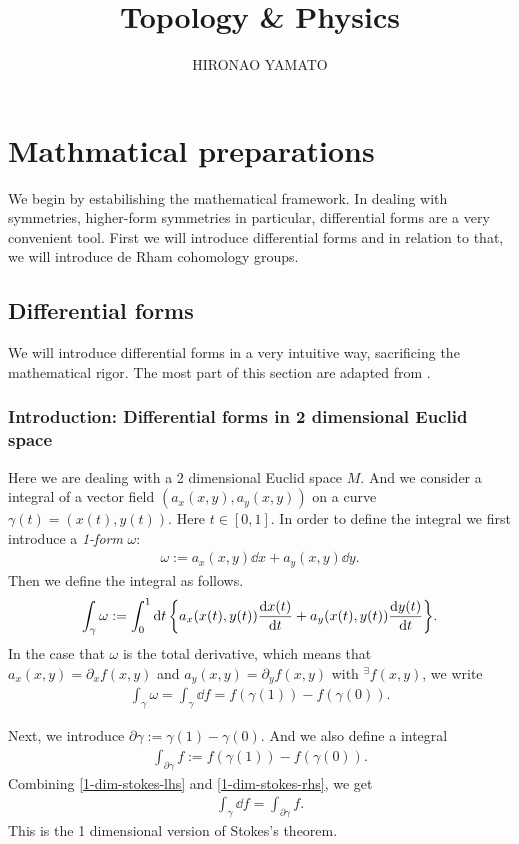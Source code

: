 \documentclass{article}
\title{{\bf Topology \& Physics}}
\author{HIRONAO YAMATO}
\date{}
\theoremstyle{definition}
\numberwithin{equation}{section}
\begin{document}
\tableofcontents

\section{Mathmatical preparations}
We begin by estabilishing the mathematical framework. In dealing with symmetries, higher-form symmetries in particular, differential forms are a very convenient tool. First we will introduce differential forms and in relation to that, we will introduce de Rham cohomology groups.

\subsection{Differential forms}
We will introduce differential forms in a very intuitive way, sacrificing the mathematical rigor. The most part of this section are adapted from \cite{Hidaka}.

\subsubsection{Introduction: Differential forms in 2 dimensional Euclid space}
Here we are dealing with a 2 dimensional Euclid space $M$. And we consider a integral of a vector field $(a_x(x, y), a_y(x, y))$ on a curve $\gamma(t) = (x(t), y(t))$. Here $t \in [0, 1]$. In order to define the integral we first introduce a \textit{1-form} $\omega$:
\begin{align}
  \omega := a_x(x, y) \dd x + a_y(x, y) \dd y.
\end{align}
Then we define the integral as follows.
\begin{align}
  \int_\gamma \omega :=
  \int_0^1 \dd t \, \qty{a_x(x(t), y(t)) \dv{x(t)}{t} + a_y(x(t), y(t)) \dv{y(t)}{t}}.
\end{align}
In the case that $\omega$ is the total derivative, which means that $a_x(x, y) = \partial_x f(x,y)$ and $a_y(x, y) = \partial_y f(x,y)$ with $^\exists f(x, y)$, we write
\begin{align}
  \int_\gamma \omega = \int_\gamma \dd f = f(\gamma(1)) - f(\gamma(0)). \label{1-dim-stokes-lhs}
\end{align}

Next, we introduce $\partial \gamma := \gamma(1) - \gamma(0)$. And we also define a integral
\begin{align}
  \int_{\partial \gamma} f := f(\gamma(1)) - f(\gamma(0)). \label{1-dim-stokes-rhs}
\end{align}
Combining \eqref{1-dim-stokes-lhs} and \eqref{1-dim-stokes-rhs}, we get
\begin{align}
  \int_\gamma \dd f = \int_{\partial \gamma} f.
\end{align}
This is the 1 dimensional version of Stokes's theorem.
\end{document}
